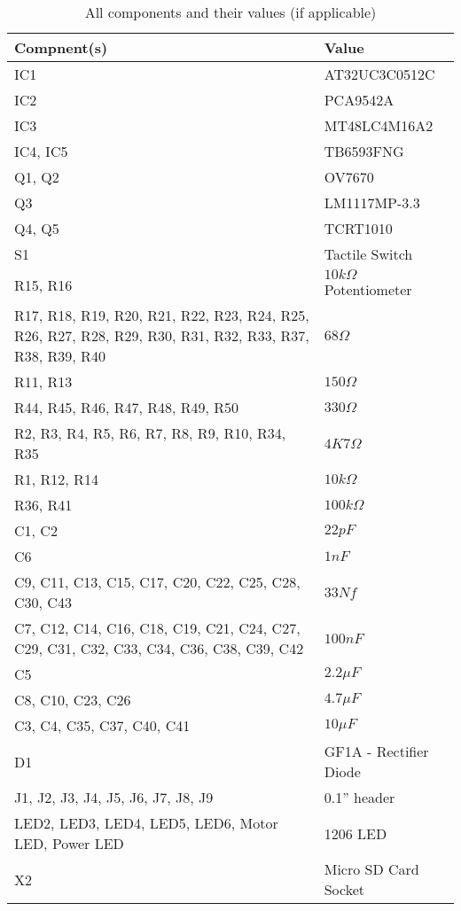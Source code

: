 \begin{table}
\caption{All components and their values (if applicable)}
\label{table:Components}
\begin{tabular}{|p{7cm}|p{5cm}|}\hline
\textbf{Compnent(s)}		&	\textbf{Value} \\ \hline
IC1				&	AT32UC3C0512C \\
IC2 & PCA9542A \\
IC3 & MT48LC4M16A2 \\
IC4, IC5 & TB6593FNG \\
Q1, Q2 & OV7670 \\
Q3	&	LM1117MP-3.3\\
Q4, Q5	& TCRT1010 \\
S1				&	Tactile Switch \\
R15, R16 & $10k\Omega$ Potentiometer\\
R17, R18, R19, R20, R21, R22, R23, R24, R25, R26, R27, R28, R29, R30, R31, R32, R33, R37, R38, R39, R40 & $68\Omega $ \\
R11, R13 & $150\Omega$ \\
R44, R45, R46, R47, R48, R49, R50	& $330\Omega$ \\
R2, R3, R4, R5, R6, R7, R8, R9, R10,  R34, R35 & $4K7\Omega$ \\
R1, R12, R14	& $10k\Omega$ \\
R36, R41	& $100k\Omega$ \\

C1, C2	&	$22pF$ \\
C6 & $1nF$ \\
C9, C11, C13, C15, C17, C20, C22, C25, C28, C30, C43 & $33Nf$ \\
C7, C12, C14, C16, C18, C19, C21, C24, C27, C29, C31, C32, C33, C34, C36, C38, C39, C42	&	$100nF$ \\
C5	&	$2.2\mu F$ \\
C8, C10, C23, C26  & $4.7\mu F $ \\
C3, C4, C35, C37, C40, C41 &	$10\mu F$ \\

D1 & GF1A - Rectifier Diode \\
J1, J2, J3, J4, J5, J6, J7, J8, J9 & 0.1'' header \\
LED2, LED3, LED4, LED5, LED6, Motor LED, Power LED	&	1206 LED \\ 
X2 & Micro SD Card Socket \\ \hline
\end{tabular}
\end{table}